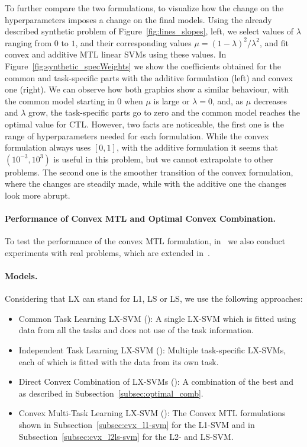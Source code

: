 %
To further compare the two formulations, to visualize how the change on the hyperparameters imposes a change on the final models. Using the already described synthetic problem of Figure~\ref{fig:lines_slopes}, left, we select values of $\lambda$ ranging from $0$ to $1$, and their corresponding values $\mu = (1-\lambda)^2 / \lambda^2$, and fit convex and additive MTL linear SVMs using these values. In Figure~\ref{fig:synthetic_specWeights} we show the coefficients obtained for the common and task-specific parts with the additive formulation (left) and convex one (right).
%
We can observe how both graphics show a similar behaviour, with the common model starting in $0$ when $\mu$ is large or $\lambda=0$, and, as $\mu$ decreases and $\lambda$ grow, the task-specific parts go to zero and the common model reaches the optimal value for CTL.
%
However, two facts are noticeable, the first one is the range of hyperparameters needed for each formulation. While the convex formulation always uses $[0, 1]$, with the additive formulation it seems that $(10^{-3}, 10^3)$ is useful in this problem, but we cannot extrapolate to other problems. The second one is the smoother transition of the convex formulation, where the changes are steadily made, while with the additive one the changes look more abrupt.



\paragraph*{Performance of Convex MTL and Optimal Convex Combination.\\}

To test the performance of the convex MTL formulation, in~\citep{RuizAD19} we also conduct experiments with real problems, which are extended in~\citep{RuizAD21}. 
\paragraph*{Models.}
Considering that {LX} can stand for {L1}, {LS} or {LS}, we use the following approaches:
\begin{itemize}
    \item {Common Task Learning LX-SVM ()}: A single LX-SVM which is fitted using data from all the tasks and does not use of the task information.
    \item {Independent Task Learning LX-SVM ()}: Multiple task-specific LX-SVMs, each of which is fitted with the data from its own task.
    \item {Direct Convex Combination of LX-SVMs ()}: A combination of the best  and  as described in Subsection~\ref{subsec:optimal_comb}.
    \item {Convex Multi-Task Learning LX-SVM ()}: The Convex MTL formulations shown in Subsection~\ref{subsec:cvx_l1-svm} for the L1-SVM and in Subsection~\ref{subsec:cvx_l2ls-svm} for the L2- and LS-SVM.
\end{itemize}

